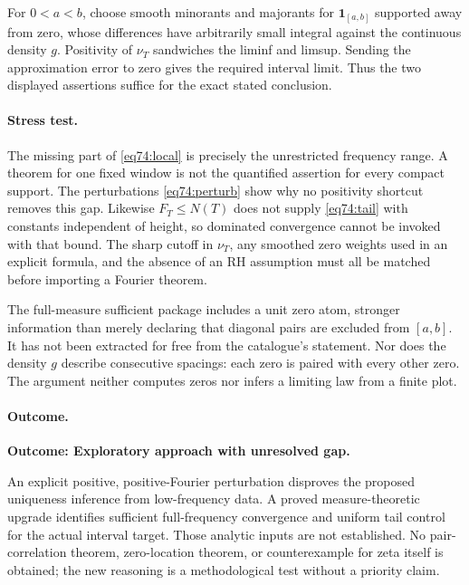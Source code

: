 \documentclass[11pt,a4paper]{article}
\numberwithin{equation}{section}
\begin{document}
For $0<a<b$, choose smooth minorants and majorants for
$\mathbf1_{[a,b]}$ supported away from zero, whose differences have
arbitrarily small integral against the continuous density $g$. Positivity
of $\nu_T$ sandwiches the liminf and limsup. Sending the approximation
error to zero gives the required interval limit. Thus the two displayed
assertions suffice for the exact stated conclusion.

\paragraph{Stress test.}
The missing part of \eqref{eq74:local} is precisely the unrestricted
frequency range. A theorem for one fixed window is not the quantified
assertion for every compact support. The perturbations
\eqref{eq74:perturb} show why no positivity shortcut removes this gap.
Likewise $F_T\leq N(T)$ does not supply \eqref{eq74:tail} with constants
independent of height, so dominated convergence cannot be invoked with
that bound. The sharp cutoff in $\nu_T$, any smoothed zero weights used in
an explicit formula, and the absence of an RH assumption must all be
matched before importing a Fourier theorem.

The full-measure sufficient package includes a unit zero atom, stronger
information than merely declaring that diagonal pairs are excluded from
$[a,b]$. It has not been extracted for free from the catalogue's statement.
Nor does the density $g$ describe consecutive spacings: each zero is paired
with every other zero. The argument neither computes zeros nor infers a
limiting law from a finite plot.

\paragraph{Outcome.}
\textbf{Outcome: Exploratory approach with unresolved gap.}

An explicit positive, positive-Fourier perturbation disproves the proposed
uniqueness inference from low-frequency data. A proved measure-theoretic
upgrade identifies sufficient full-frequency convergence and uniform tail
control for the actual interval target. Those analytic inputs are not
established. No pair-correlation theorem, zero-location theorem, or
counterexample for zeta itself is obtained; the new reasoning is a
methodological test without a priority claim.

\needspace{170mm}
\end{document}
